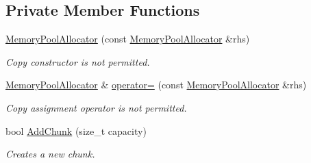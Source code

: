 \subsection*{Private Member Functions}
\begin{DoxyCompactItemize}
\item 
\mbox{\hyperlink{classrapidjson_1_1_memory_pool_allocator_a7aebc93e8dc47971bb3f2e4e50677912}{Memory\+Pool\+Allocator}} (const \mbox{\hyperlink{classrapidjson_1_1_memory_pool_allocator}{Memory\+Pool\+Allocator}} \&rhs)
\begin{DoxyCompactList}\small\item\em Copy constructor is not permitted. \end{DoxyCompactList}\item 
\mbox{\hyperlink{classrapidjson_1_1_memory_pool_allocator}{Memory\+Pool\+Allocator}} \& \mbox{\hyperlink{classrapidjson_1_1_memory_pool_allocator_aa0691de3f5f34cb7f89628af74c6283b}{operator=}} (const \mbox{\hyperlink{classrapidjson_1_1_memory_pool_allocator}{Memory\+Pool\+Allocator}} \&rhs)
\begin{DoxyCompactList}\small\item\em Copy assignment operator is not permitted. \end{DoxyCompactList}\item 
bool \mbox{\hyperlink{classrapidjson_1_1_memory_pool_allocator_aa35232aea8863efcdf29139f42c6ef68}{Add\+Chunk}} (size\+\_\+t capacity)
\begin{DoxyCompactList}\small\item\em Creates a new chunk. \end{DoxyCompactList}\end{DoxyCompactItemize}

